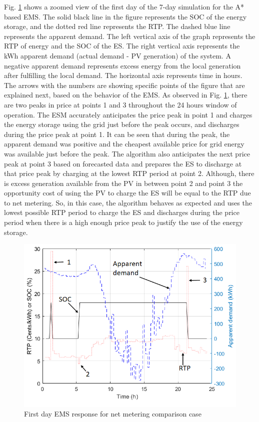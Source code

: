 Fig. \ref{fig:SBMPO_COMP_1_day} shows a zoomed view of the first day of the 7-day simulation for the A* based EMS. The solid black line in the figure represents the SOC of the energy storage, and the dotted red line represents the RTP. The dashed blue line represents the apparent demand. The left vertical axis of the graph represents the RTP of energy and the SOC of the ES. The right vertical axis represents the kWh apparent demand (actual demand - PV generation) of the system. A negative apparent demand represents excess energy from the local generation after fulfilling the local demand. The horizontal axis represents time in hours. The arrows with the numbers are showing specific points of the figure that are explained next, based on the behavior of the EMS. As observed in Fig. \ref{fig:SBMPO_COMP_1_day}, there are two peaks in price at points 1 and 3 throughout the 24 hours window of operation. The ESM accurately anticipates the price peak in point 1 and charges the energy storage using the grid just before the peak occurs, and discharges during the price peak at point 1. It can be seen that during the peak, the apparent demand was positive and the cheapest available price for grid energy was available just before the peak. The algorithm also anticipates the next price peak at point 3 based on forecasted data and prepares the ES to discharge at that price peak by charging at the lowest RTP period at point 2. Although, there is excess generation available from the PV in between point 2 and point 3 the opportunity cost of using the PV to charge the ES will be equal to the RTP due to net metering. So, in this case, the algorithm behaves as expected and uses the lowest possible RTP period to charge the ES and discharges during the price period when there is a high enough price peak to justify the use of the energy storage.

\begin{figure}[!ht]
    \centering
    \includegraphics[width = 0.8\linewidth]{figs/SBMPO_COMP_1_day.png}
    \caption{First day EMS response for net metering comparison case}
    \label{fig:SBMPO_COMP_1_day}
\end{figure}

